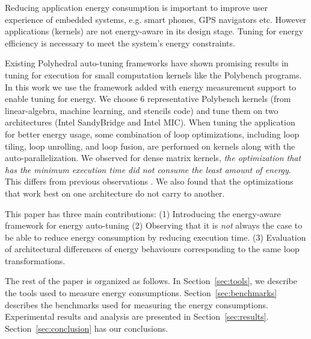 Reducing application energy consumption is important to improve user experience of 
embedded systems, e.g. smart phones, GPS navigators etc.  
However applications (kernels) are not energy-aware in its design stage. Tuning
for energy efficiency is necessary to meet the system's energy constraints.

Existing Polyhedral auto-tuning frameworks have shown promising results in tuning for execution
for small computation kernels like the Polybench programs\cite{EJ2012}. 
In this work we use the framework added with energy measurement support to enable tuning for energy.
We choose 6 representative Polybench kernels (from linear-algebra, machine learning, and stencils code) 
and tune them on two architectures (Intel SandyBridge and Intel MIC).
When tuning the application for better energy usage, some combination of loop optimizations, including loop 
tiling, loop unrolling, and loop fusion, are performed on kernels along with the auto-parallelization.
We observed for dense matrix kernels, \emph{the optimization that has the minimum execution time 
did not consume the least amount of energy}. This differs from previous observations \cite{Wang2014}.
We also found that the optimizations that work best on one architecture do not carry to another.  
 
This paper has three main contributions: 
(1) Introducing the energy-aware framework for energy auto-tuning
(2) Observing that it is \emph{not} always the case to be able to reduce energy consumption by reducing execution time.
(3) Evaluation of architectural differences of energy behaviours corresponding to the same loop transformations.

The rest of the paper is organized as follows. In Section~\ref{sec:tools}, we describe the tools
used to measure energy consumptions. Section~\ref{sec:benchmarks} describes the benchmarks used for  
measuring the energy consumptions. Experimental results and analysis are presented in Section~\ref{sec:results}. Section~\ref{sec:conclusion} has our conclusions.

